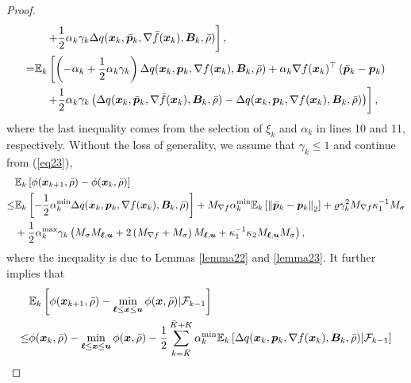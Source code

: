 \documentclass[aos]{imsart}
\numberwithin{equation}{section}
\theoremstyle{plain}
\begin{document}
\begin{appendix}
\begin{proof}
\begin{equation}
\begin{split}
            & \hspace{1em} \left.+ \frac{1}{2} \alpha_k \gamma_k \Delta q(\bm{x}_k,\Bar{\bm{p}}_k,\nabla \Bar{f}(\bm{x}_k),\bm{B}_k,\Bar{\rho})  \right], \\
            = & \mathbb{E}_k \left[ \left( - \alpha_k + \frac{1}{2} \alpha_k \gamma_k \right) \Delta q(\bm{x}_k,\bm{p}_k,\nabla f(\bm{x}_k),\bm{B}_k,\Bar{\rho})  + \alpha_k \nabla f(\bm{x}_k)^{\top} \left(\Bar{\bm{p}}_k - \bm{p}_k \right) \right.\\
            & \hspace{1em} \left.+ \frac{1}{2} \alpha_k \gamma_k \left( \Delta q(\bm{x}_k,\Bar{\bm{p}}_k,\nabla \Bar{f}(\bm{x}_k),\bm{B}_k,\Bar{\rho}) - \Delta q(\bm{x}_k,\bm{p}_k,\nabla f(\bm{x}_k),\bm{B}_k,\Bar{\rho}) \right)  \right], \\
        \end{split}
    \end{equation}
    where the last inequality comes from the selection of $\xi_k$ and $\alpha_k$ in lines 10 and 11, respectively. Without the loss of generality, we assume that $\gamma_k \leq 1$ and continue from (\ref{eq23}), 
    \begin{equation*}
        \begin{split}
            & \mathbb{E}_k \left[ \phi(\bm{x}_{k+1},\Bar{\rho}) - \phi(\bm{x}_{k},\Bar{\rho}) \right] \\
            \leq & \mathbb{E}_k \left[ - \frac{1}{2} \alpha_k^{\text{min}}   \Delta q(\bm{x}_k,\bm{p}_k,\nabla f(\bm{x}_k),\bm{B}_k,\Bar{\rho}) \right] + M_{\nabla f} \alpha_k^{\text{min}} \mathbb{E}_k \left[ \left\|\Bar{\bm{p}}_k - \bm{p}_k \right\|_2 \right] + \varrho \gamma_k^2 M_{\nabla f} \kappa_1^{-1} M_{\sigma}  \\
            & + \frac{1}{2} \alpha_k^{\text{max}} \gamma_k \left( M_{\sigma} M_{\bm{\ell},\bm{u}} + 2 \left(M_{\nabla f} + M_{\sigma} \right) M_{\bm{\ell},\bm{u}} + \kappa_1^{-1} \kappa_2 M_{\bm{\ell},\bm{u}} M_{\sigma} \right),
        \end{split}
    \end{equation*}
    where the inequality is due to Lemmas \ref{lemma22} and \ref{lemma23}. It further implies that 
    \begin{equation}
    \label{eq24}
      \begin{split}
            & \mathbb{E}_k \left[ \phi(\bm{x}_{k+1},\Bar{\rho}) - \min_{\bm{\ell} \leq \bm{x} \leq \bm{u}}\phi(\bm{x},\Bar{\rho}) | \mathcal{F}_{k-1} \right]\\
            \leq & \phi(\bm{x}_{k},\Bar{\rho}) - \min_{\bm{\ell} \leq \bm{x} \leq \bm{u}}\phi(\bm{x},\Bar{\rho}) -\frac{1}{2} \sum_{k=\Bar{K}}^{\Bar{K} + K} \alpha_k^{\text{min}} \mathbb{E}_k \left[ \Delta q(\bm{x}_k,\bm{p}_k,\nabla f(\bm{x}_k),\bm{B}_k,\Bar{\rho}) | \mathcal{F}_{k-1} \right] \\

\end{split}
\end{equation}
\end{proof}
\end{appendix}
\end{document}
